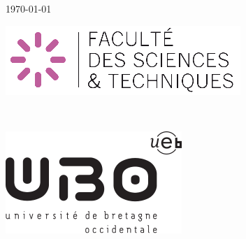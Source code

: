 \documentclass[a4paper,12pt]{report}
\begin{document}
\begin{titlepage}
    
    {\today}\\[1.5cm] %
    
    
		\begin{minipage}{0.48\textwidth}
			\begin{flushleft} \large
				\includegraphics[scale=0.8]{ubo_sc.png} %
			\end{flushleft}
    \end{minipage}
		~
    \begin{minipage}{0.48\textwidth}
			\begin{flushright} \large
				\includegraphics[scale=0.5]{ubo.png} %
			\end{flushright}
    \end{minipage}
    
    
    \vfill %
    
    \end{titlepage}
		
	\pagestyle{fancy}
		\lhead{}
		\rhead{}
		\lfoot{}
		\cfoot{\thepage}
		\rfoot{}
		
\end{document}
